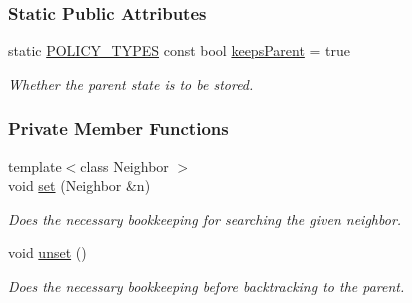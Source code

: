\subsubsection*{Static Public Attributes}
\begin{DoxyCompactItemize}
\item 
static \hyperlink{extensions_2shared__policies_2headers_8h_ae70a06fa4631780beea14971eb36a562}{P\+O\+L\+I\+C\+Y\+\_\+\+T\+Y\+P\+ES} const bool \hyperlink{structslb_1_1ext_1_1policy_1_1backtrackLock_1_1Copy_ae204f588322f4f8327718d3d58a9f716}{keeps\+Parent} = true\hypertarget{structslb_1_1ext_1_1policy_1_1backtrackLock_1_1Copy_ae204f588322f4f8327718d3d58a9f716}{}\label{structslb_1_1ext_1_1policy_1_1backtrackLock_1_1Copy_ae204f588322f4f8327718d3d58a9f716}

\begin{DoxyCompactList}\small\item\em Whether the parent state is to be stored. \end{DoxyCompactList}\end{DoxyCompactItemize}
\subsubsection*{Private Member Functions}
\begin{DoxyCompactItemize}
\item 
{\footnotesize template$<$class Neighbor $>$ }\\void \hyperlink{structslb_1_1ext_1_1policy_1_1backtrackLock_1_1Copy_aace96cb06beb97239e1e879de560ccff}{set} (Neighbor \&n)
\begin{DoxyCompactList}\small\item\em Does the necessary bookkeeping for searching the given neighbor. \end{DoxyCompactList}\item 
void \hyperlink{structslb_1_1ext_1_1policy_1_1backtrackLock_1_1Copy_a5422a7c3500ba11c4f2ee3b09a96e7fb}{unset} ()\hypertarget{structslb_1_1ext_1_1policy_1_1backtrackLock_1_1Copy_a5422a7c3500ba11c4f2ee3b09a96e7fb}{}\label{structslb_1_1ext_1_1policy_1_1backtrackLock_1_1Copy_a5422a7c3500ba11c4f2ee3b09a96e7fb}

\begin{DoxyCompactList}\small\item\em Does the necessary bookkeeping before backtracking to the parent. \end{DoxyCompactList}\end{DoxyCompactItemize}
